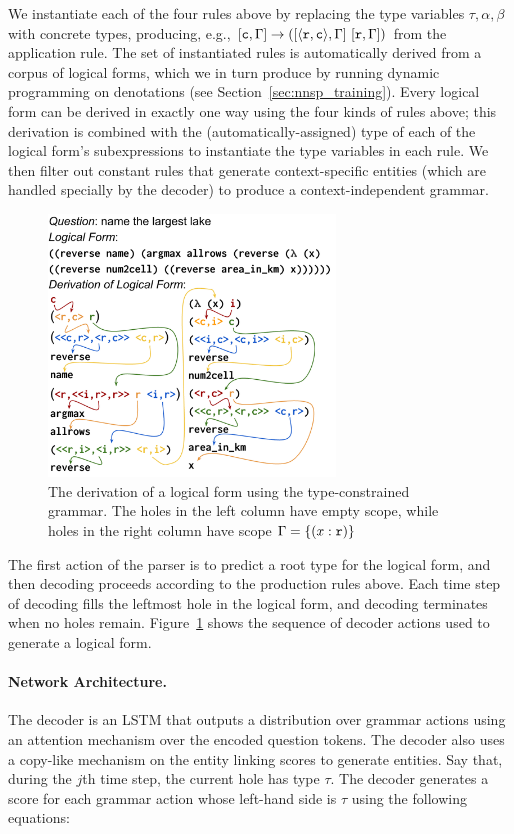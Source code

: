 We instantiate each of the four rules above by replacing the type variables 
$\tau, \alpha,\beta$ with concrete types, producing, e.g., $[\mathtt{c},\Gamma] 
\rightarrow ([\mathtt{\langle \mathtt{r},\mathtt{c} \rangle},\Gamma]~[\mathtt{r},\Gamma])$ from the application 
rule.
The set of instantiated rules is automatically derived from a corpus of logical 
forms, which we in turn produce by running dynamic programming on denotations 
(see Section~\ref{sec:nnsp_training}).
Every logical form can be derived in exactly one way using the four kinds of 
rules above; this derivation is combined with the (automatically-assigned) type 
of each of the logical form's subexpressions to instantiate the type variables 
in each rule.
We then filter out constant rules that generate context-specific entities 
(which are 
handled specially by the decoder) to produce a 
context-independent grammar.

\begin{figure}
\centering
\includegraphics[width=3in]{figures/nnsp_example_derivation.png}
\caption{The derivation of a logical form using the  type-constrained grammar. 
The holes in the left column have 
empty scope, while holes in the right column have scope $\Gamma = \{(x : 
\mathtt{r})\}$}
\label{fig:grammar_derivation}
\end{figure}

The first action of the parser is to predict a root type for the logical form, 
and then decoding proceeds according to the production rules above.
Each time step of decoding fills the leftmost hole in the logical form, and 
decoding terminates when no holes remain.
Figure~\ref{fig:grammar_derivation} shows the sequence of decoder actions used 
to generate a logical form.

\paragraph{Network Architecture.} The decoder is an LSTM that outputs a 
distribution over grammar actions using an attention mechanism over the encoded 
question tokens. The decoder also uses a copy-like mechanism on the entity 
linking scores to generate entities.
Say that, during the $j$th time step, the current hole has type $\tau$. The 
decoder generates a score for each grammar action whose left-hand side is 
$\tau$ using the following equations:

